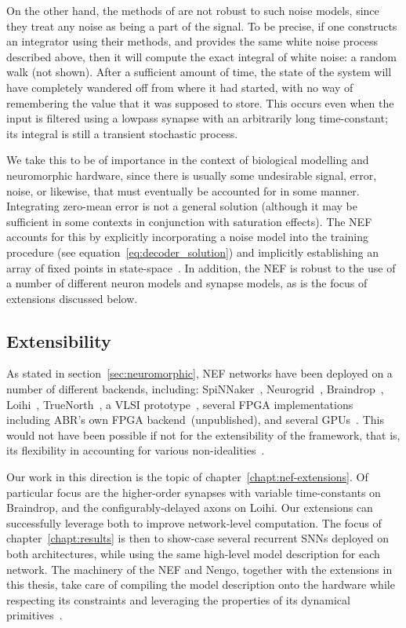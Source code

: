 On the other hand, the methods of \citet{boerlin2013predictive} are not robust to such noise models, since they treat any noise as being a part of the signal.
To be precise, if one constructs an integrator using their methods, and provides the same white noise process described above, then it will compute the exact integral of white noise: a random walk (not shown).
After a sufficient amount of time, the state of the system will have completely wandered off from where it had started, with no way of remembering the value that it was supposed to store.
This occurs even when the input is filtered using a lowpass synapse with an arbitrarily long time-constant; its integral is still a transient stochastic process.

We take this to be of importance in the context of biological modelling and neuromorphic hardware, since there is usually some undesirable signal, error, noise, or likewise, that must eventually be accounted for in some manner.
Integrating zero-mean error is not a general solution (although it may be sufficient in some contexts in conjunction with saturation effects).
The NEF accounts for this by explicitly incorporating a noise model into the training procedure (see equation~\ref{eq:decoder_solution}) and implicitly establishing an array of fixed points in state-space~\citep[][p.~237]{eliasmith2003a}.
In addition, the NEF is robust to the use of a number of different neuron models and synapse models, as is the focus of extensions discussed below.

\subsection{Extensibility}
\label{sec:nef-extensibility}

As stated in section~\ref{sec:neuromorphic}, NEF networks have been deployed on a number of different backends, including:
SpiNNaker~\citep{mundy2015},
Neurogrid~\citep{choudhary2012silicon},
Braindrop~\citep{braindrop2019},
Loihi~\citep{davies2018loihi},
TrueNorth~\citep{fischl2018},
a VLSI prototype~\citep{corradi2014},
several FPGA implementations~\citep{naylor2013managing, wang2014compact, berzish2016, wang2017neuromorphic} including ABR's own FPGA backend~(unpublished),
and several GPUs~\citep{bekolay2014, rasmussen2018nengodl, blouw2018a}.
This would not have been possible if not for the extensibility of the framework, that is, its flexibility in accounting for various non-idealities~\citep[e.g.,~][]{voelker2017iscas}.

Our work in this direction is the topic of chapter~\ref{chapt:nef-extensions}.
Of particular focus are the higher-order synapses with variable time-constants on Braindrop, and the configurably-delayed axons on Loihi.
Our extensions can successfully leverage both to improve network-level computation.
The focus of chapter~\ref{chapt:results} is then to show-case several recurrent SNNs deployed on both architectures, while using the same high-level model description for each network.
The machinery of the NEF and Nengo, together with the extensions in this thesis, take care of compiling the model description onto the hardware while respecting its constraints and leveraging the properties of its dynamical primitives~\citep{braindrop2019}.
